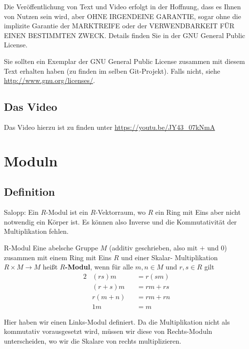 \documentclass[a4paper]{amsart}
\theoremstyle{definition}
\begin{document}
Die Veröffentlichung von Text und Video erfolgt in der Hoffnung, dass es Ihnen von Nutzen sein wird,
aber OHNE IRGENDEINE GARANTIE, sogar ohne die implizite Garantie der MARKTREIFE oder der
VERWENDBARKEIT FÜR EINEN BESTIMMTEN ZWECK. Details finden Sie in der GNU General Public License.

Sie sollten ein Exemplar der GNU General Public License zusammen mit diesem Text erhalten haben
(zu finden im selben Git-Projekt).
Falls nicht, siehe \url{http://www.gnu.org/licenses/}.

\subsection*{Das Video}
Das Video hierzu ist zu finden unter
{\tiny
   \url{https://youtu.be/JY43_07kNmA}
}

\section{Moduln}

\subsection{Definition}
Salopp: Ein $R$-Modul ist ein $R$-Vektorraum, wo $R$ ein Ring mit Eins aber nicht notwendig ein Körper ist. Es können also Inverse und die Kommutativität der Multiplikation fehlen.

\begin{Definition}{R-Modul}
   Eine abelsche Gruppe $M$ (additiv geschrieben, also mit $+$ und $0$) zusammen mit einem  Ring mit Eins $R$ und einer Skalar- Multiplikation $R \times M \to M$ heißt $R$\textbf{-Modul}, wenn für alle $m,n \in M$ und $r, s \in R$ gilt
   \begin{alignat}{2}
      &(rs)m &&= r(sm)\\
      &(r+s)m &&= rm + rs\\
      &r(m+n) &&= rm +rn\\
      &1m &&= m
   \end{alignat}
\end{Definition}
Hier haben wir einen Links-Modul definiert. Da die Multiplikation nicht als kommutativ vorausgesetzt wird, müssen wir diese von Rechts-Moduln unterscheiden, wo wir die Skalare von rechts multiplizieren. 
\end{document}
